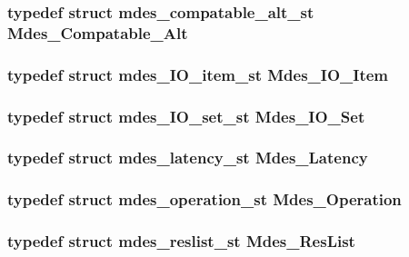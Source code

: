 \subsubsection{\setlength{\rightskip}{0pt plus 5cm}typedef struct \bf{mdes\_\-compatable\_\-alt\_\-st}
 \bf{Mdes\_\-Compatable\_\-Alt}}\label{lmdes_8h_7713e4afedbaa57e0062663a1b6cbe22}


\subsubsection{\setlength{\rightskip}{0pt plus 5cm}typedef struct \bf{mdes\_\-IO\_\-item\_\-st}
 \bf{Mdes\_\-IO\_\-Item}}\label{lmdes_8h_c87d75377929b8a420f63ec606b8507b}


\subsubsection{\setlength{\rightskip}{0pt plus 5cm}typedef struct \bf{mdes\_\-IO\_\-set\_\-st}
 \bf{Mdes\_\-IO\_\-Set}}\label{lmdes_8h_952cfc93036cec851c6113fcb7cdd4a2}


\subsubsection{\setlength{\rightskip}{0pt plus 5cm}typedef struct \bf{mdes\_\-latency\_\-st}
 \bf{Mdes\_\-Latency}}\label{lmdes_8h_48360901c68bd565427b2570d662d0b5}


\subsubsection{\setlength{\rightskip}{0pt plus 5cm}typedef struct \bf{mdes\_\-operation\_\-st}
 \bf{Mdes\_\-Operation}}\label{lmdes_8h_54073b7cc26278125d7a2d1737517542}


\subsubsection{\setlength{\rightskip}{0pt plus 5cm}typedef struct \bf{mdes\_\-reslist\_\-st}
 \bf{Mdes\_\-Res\-List}}\label{lmdes_8h_e3f1e591ab5452a9f1df447c9f7b5d2f}


